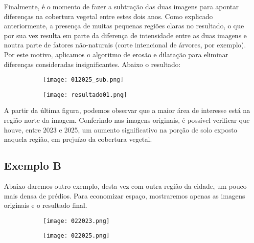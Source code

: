 \documentclass{article}
\begin{document}
Finalmente, é o momento de fazer a subtração das duas imagens para apontar diferenças na cobertura vegetal entre estes dois anos. Como explicado anteriormente, a presença de muitas pequenas regiões claras no resultado, o que por sua vez resulta em parte da diferença de intensidade entre as duas imagens e noutra parte de fatores não-naturais (corte intencional de árvores, por exemplo). Por este motivo, aplicamos o algoritmo de erosão e dilatação para eliminar diferenças consideradas insignificantes. Abaixo o resultado:

\begin{figure}[H]
    \centering
    \begin{subfigure}[b]{0.48\textwidth}
        \texttt{[image: 012025\_sub.png]}
        \label{2023}
    \end{subfigure}
    \hfill %
    \begin{subfigure}[b]{0.48\textwidth}
        \texttt{[image: resultado01.png]}
        \label{2025}
    \end{subfigure}
    \label{resultado}
\end{figure}

A partir da última figura, podemos observar que a maior área de interesse está na região norte da imagem. Conferindo nas imagens originais, é possível verificar que houve, entre 2023 e 2025, um aumento significativo na porção de solo exposto naquela região, em prejuízo da cobertura vegetal.

\subsection{Exemplo B}

Abaixo daremos outro exemplo, desta vez com outra região da cidade, um pouco mais densa de prédios. Para economizar espaço, mostraremos apenas as imagens originais e o resultado final.

\begin{figure}[H]
    \centering
    \begin{subfigure}[b]{0.48\textwidth}
        \texttt{[image: 022023.png]}
        \label{2023}
    \end{subfigure}
    \hfill %
    \begin{subfigure}[b]{0.48\textwidth}
        \texttt{[image: 022025.png]}
        \label{2025}
    \end{subfigure}
    \label{original}
\end{figure}
\end{document}
